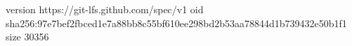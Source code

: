version https://git-lfs.github.com/spec/v1
oid sha256:97e7bef2fbced1e7a88bb8c55bf610ee298bd2b53aa78844d1b739432e50b1f1
size 30356

